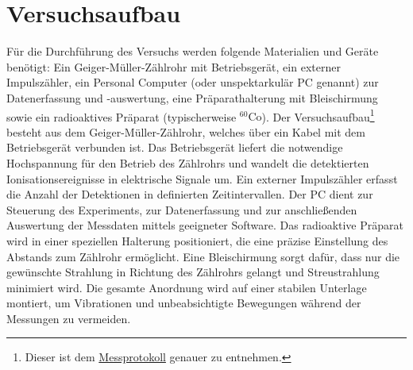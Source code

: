 \section{Versuchsaufbau}
\label{sec:Versucshaufbau}
Für die Durchführung des Versuchs werden folgende Materialien und Geräte benötigt: Ein Geiger-Müller-Zählrohr mit Betriebsgerät, ein externer Impulszähler, ein Personal Computer (oder unspektarkulär PC genannt) zur Datenerfassung und -auswertung, eine Präparathalterung mit Bleischirmung sowie ein radioaktives Präparat (typischerweise $^{60}\mathrm{Co}$).
Der Versuchsaufbau\footnote{Dieser ist dem \hyperref[ch:Protokoll]{Messprotokoll} genauer zu entnehmen.} besteht aus dem Geiger-Müller-Zählrohr, welches über ein Kabel mit dem Betriebsgerät verbunden ist. Das Betriebsgerät liefert die notwendige Hochspannung für den Betrieb des Zählrohrs und wandelt die detektierten Ionisationsereignisse in elektrische Signale um. Ein externer Impulszähler erfasst die Anzahl der Detektionen in definierten Zeitintervallen. Der PC dient zur Steuerung des Experiments, zur Datenerfassung und zur anschließenden Auswertung der Messdaten mittels geeigneter Software.
Das radioaktive Präparat wird in einer speziellen Halterung positioniert, die eine präzise Einstellung des Abstands zum Zählrohr ermöglicht. Eine Bleischirmung sorgt dafür, dass nur die gewünschte Strahlung in Richtung des Zählrohrs gelangt und Streustrahlung minimiert wird. Die gesamte Anordnung wird auf einer stabilen Unterlage montiert, um Vibrationen und unbeabsichtigte Bewegungen während der Messungen zu vermeiden.

